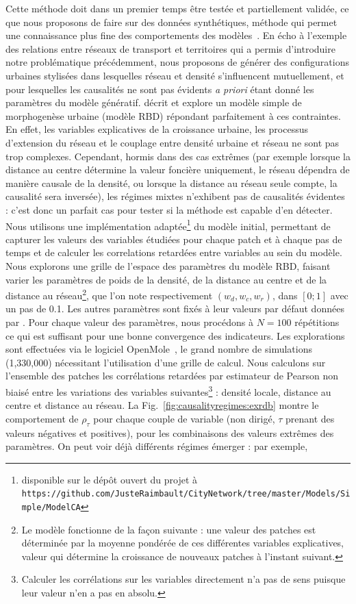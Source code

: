 Cette méthode doit dans un premier temps être testée et partiellement validée, ce que nous proposons de faire sur des données synthétiques, méthode qui permet une connaissance plus fine des comportements des modèles~\cite{raimbault2016generation}. En écho à l'exemple des relations entre réseaux de transport et territoires qui a permis d'introduire notre problématique précédemment, nous proposons de générer des configurations urbaines stylisées dans lesquelles réseau et densité s'influencent mutuellement, et pour lesquelles les causalités ne sont pas évidents \emph{a priori} étant donné les paramètres du modèle génératif. \cite{raimbault2014hybrid} décrit et explore un modèle simple de morphogenèse urbaine (modèle RBD) répondant parfaitement à ces contraintes. En effet, les variables explicatives de la croissance urbaine, les processus d'extension du réseau et le couplage entre densité urbaine et réseau ne sont pas trop complexes. Cependant, hormis dans des cas extrêmes (par exemple lorsque la distance au centre détermine la valeur foncière uniquement, le réseau dépendra de manière causale de la densité, ou lorsque la distance au réseau seule compte, la causalité sera inversée), les régimes mixtes n'exhibent pas de causalités évidentes : c'est donc un parfait cas pour tester si la méthode est capable d'en détecter. Nous utilisons une implémentation adaptée\footnote{disponible sur le dépôt ouvert du projet à\\\texttt{https://github.com/JusteRaimbault/CityNetwork/tree/master/Models/Simple/ModelCA}} du modèle initial, permettant de capturer les valeurs des variables étudiées pour chaque patch et à chaque pas de temps et de calculer les correlations retardées entre variables au sein du modèle. Nous explorons une grille de l'espace des paramètres du modèle RBD, faisant varier les paramètres de poids de la densité, de la distance au centre et de la distance au réseau\footnote{Le modèle fonctionne de la façon suivante : une valeur des patches est déterminée par la moyenne pondérée de ces différentes variables explicatives, valeur qui détermine la croissance de nouveaux patches à l'instant suivant.}, que l'on note respectivement $(w_{d},w_{c},w_{r})$, dans $\left[0;1\right]$ avec un pas de 0.1. Les autres paramètres sont fixés à leur valeurs par défaut données par \cite{raimbault2014hybrid}. Pour chaque valeur des paramètres, nous procédons à $N=100$ répétitions ce qui est suffisant pour une bonne convergence des indicateurs. Les explorations sont effectuées via le logiciel OpenMole~\cite{reuillon2013openmole}, le grand nombre de simulations (1,330,000) nécessitant l'utilisation d'une grille de calcul. Nous calculons sur l'ensemble des patches les corrélations retardées par estimateur de Pearson non biaisé entre les variations des variables suivantes\footnote{Calculer les corrélations sur les variables directement n'a pas de sens puisque leur valeur n'en a pas en absolu.} : densité locale, distance au centre et distance au réseau. La Fig.~\ref{fig:causalityregimes:exrdb} montre le comportement de $\rho_{\tau}$ pour chaque couple de variable (non dirigé, $\tau$ prenant des valeurs négatives et positives), pour les combinaisons des valeurs extrêmes des paramètres. On peut voir déjà différents régimes émerger : par exemple, 